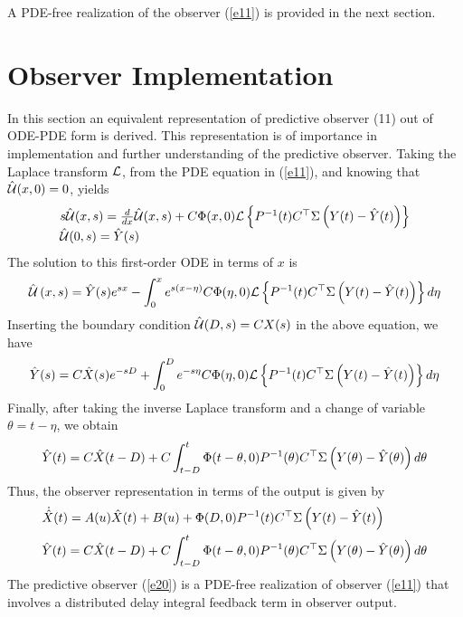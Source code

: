 \documentclass[12pt,draftcls,onecolumn]{IEEEtran}
\begin{document}
A PDE-free realization of the observer (\ref{e11}) is provided in the next section.

\section{Observer Implementation}

In this section an equivalent representation of predictive observer (11) out of ODE-PDE form is derived. This representation is of importance in implementation and further understanding of the predictive observer.
Taking the Laplace transform ${\cal L}$, from the PDE equation in (\ref{e11}), and knowing that $\hat {\cal U}(x,0) = 0$, yields
\[\begin{array}{l}
s\hat {\cal U}(x,s) = \frac{d}{{dx}}\hat {\cal U}(x,s) + C\Phi (x,0){\cal L}\left\{ {{P^{ - 1}}(t){C^{\top} }{\rm{\Sigma }}\left( {Y(t) - \hat Y(t)} \right)} \right\}\\
\hat {\cal U}(0,s) = \hat Y(s)
\end{array}\]
The solution to this first-order ODE in terms of $x$ is
\[\hat {\cal U}\,(x,s) = \hat Y(s){e^{sx}} - \int_0^x {{e^{s(x - \eta )}}C} \Phi (\eta ,0){\cal L}\left\{ {{P^{ - 1}}(t){C^{\top} }{\rm{\Sigma }}\left( {Y(t) - \hat Y(t)} \right)} \right\}d\eta \]
Inserting the boundary condition $ \hat {\cal U}(D,s) = CX(s) $ in the above equation, we have 
\[\hat Y(s) = C\hat X(s){e^{ - sD}} + \int_0^D {{e^{ - s\eta }}C} \Phi (\eta ,0){\cal L}\left\{ {{P^{ - 1}}(t){C^{\top} }{\rm{\Sigma }}\left( {Y(t) - \hat Y(t)} \right)} \right\}d\eta \]
Finally, after taking the inverse Laplace transform and a change of variable $\theta  = t - \eta $, we obtain
\[\hat Y(t) = C\hat X(t - D) + C\int_{t - D}^t {\Phi (t - \theta ,0){P^{ - 1}}(\theta ){C^{\top} }{\rm{\Sigma }}\left( {Y(\theta ) - \hat Y(\theta )} \right)d\theta } \]
Thus, the observer representation in terms of the output is given by
\begin{equation} \label{e20}
\begin{aligned}
&\dot{\hat {X}}(t) = A(u)\hat X(t) + B(u) + \Phi (D,0){P^{ - 1}}(t){C^{\top} }{\rm{\Sigma }}\left( {Y(t) - \hat Y(t)} \right)\\
&\hat Y(t) = C\hat X(t - D) + C\int_{t - D}^t {\Phi (t - \theta ,0){P^{ - 1}}(\theta ){C^{\top} }{\rm{\Sigma }}\left( {Y(\theta ) - \hat Y(\theta )} \right)d\theta }
\end{aligned}
\end{equation}
The predictive observer (\ref{e20}) is a PDE-free realization of observer (\ref{e11}) that involves a distributed delay integral feedback term in observer output.
\end{document}
